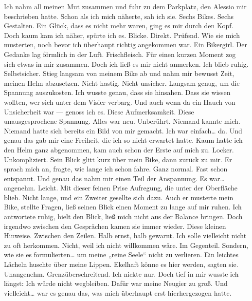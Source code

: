 Ich nahm all meinen Mut zusammen und fuhr zu dem Parkplatz, den Alessio mir beschrieben hatte.
Schon als ich mich näherte, sah ich sie.
Sechs Bikes. Sechs Gestalten.
Ein Glück, dass es nicht mehr waren, ging es mir durch den Kopf.
Doch kaum kam ich näher, spürte ich es.
Blicke.
Direkt. Prüfend.
Wie sie mich musterten, noch bevor ich überhaupt richtig angekommen war.
Ein Bikergirl.
Der Gedanke lag förmlich in der Luft.
Frischfleisch.
Für einen kurzen Moment zog sich etwas in mir zusammen.
Doch ich ließ es mir nicht anmerken.
Ich blieb ruhig.
Selbstsicher.
Stieg langsam von meinem Bike ab und nahm mir bewusst Zeit, meinen Helm abzusetzen.
Nicht hastig.
Nicht unsicher.
Langsam genug, um die Spannung auszukosten.
Ich wusste genau, dass sie hinsahen.
Dass sie wissen wollten, wer sich unter dem Visier verbarg.
Und auch wenn da ein Hauch von Unsicherheit war —
genoss ich es.
Diese Aufmerksamkeit.
Diese unausgesprochene Spannung.
Alles war neu.
Unberührt.
Niemand kannte mich.
Niemand hatte sich bereits ein Bild von mir gemacht.
Ich war einfach… da.
Und genau das gab mir eine Freiheit, die ich so nicht erwartet hatte.
Kaum hatte ich den Helm ganz abgenommen, kam auch schon der Erste auf mich zu.
Locker. Unkompliziert.
Sein Blick glitt kurz über mein Bike, dann zurück zu mir.
Er sprach mich an, fragte, wie lange ich schon fahre.
Ganz normal. Fast schon entspannt.
Und genau das nahm mir einen Teil der Anspannung.
Es war… angenehm.
Leicht.
Mit dieser feinen Prise Aufregung, die unter der Oberfläche blieb.
Nicht lange, und ein Zweiter gesellte sich dazu.
Auch er musterte mein Bike, stellte Fragen, ließ seinen Blick einen Moment zu lange auf mir ruhen.
Ich antwortete ruhig, hielt den Blick, ließ mich nicht aus der Balance bringen.
Doch irgendwo zwischen den Gesprächen kamen sie immer wieder.
Diese kleinen Hinweise.
Zwischen den Zeilen.
Halb ernst, halb gewarnt.
Ich solle vielleicht nicht zu oft herkommen.
Nicht, weil ich nicht willkommen wäre.
Im Gegenteil.
Sondern, wie sie es formulierten…
um meine „reine Seele“ nicht zu verlieren.
Ein leichtes Lächeln huschte über meine Lippen.
Ekelhaft könne es hier werden, sagten sie.
Unangenehm.
Grenzüberschreitend.
Ich nickte nur.
Doch tief in mir wusste ich längst:
Ich würde nicht wegbleiben.
Dafür war meine Neugier zu groß.
Und vielleicht…
war es genau das, was mich überhaupt erst hierhergezogen hatte.

